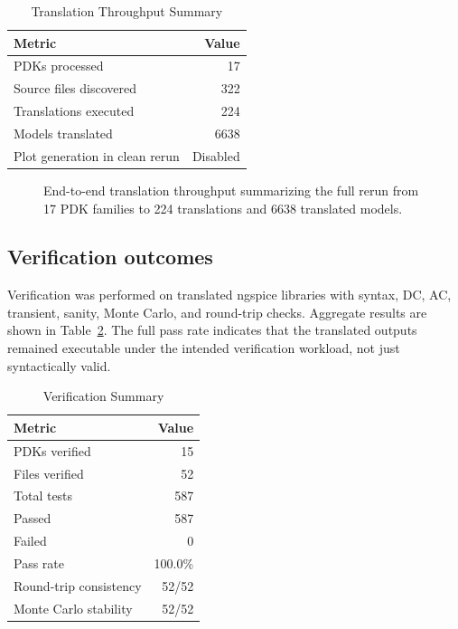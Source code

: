 \documentclass[10pt,twocolumn]{article}
\begin{document}
\begin{table}[t]
\caption{Translation Throughput Summary}
\label{tab:throughput}
\centering
\begin{tabular}{@{}lr@{}}
\toprule
Metric & Value \\
\midrule
PDKs processed & 17 \\
Source files discovered & 322 \\
Translations executed & 224 \\
Models translated & 6638 \\
Plot generation in clean rerun & Disabled \\
\bottomrule
\end{tabular}
\end{table}

\begin{figure}[t]
\centering
{}
\caption{End-to-end translation throughput summarizing the full rerun from 17 PDK families to 224 translations and 6638 translated models.}
\label{fig:throughput}
\end{figure}

\subsection{Verification outcomes}
Verification was performed on translated ngspice libraries with syntax, DC, AC, transient, sanity, Monte Carlo, and round-trip checks. Aggregate results are shown in Table~\ref{tab:verification_summary}. The full pass rate indicates that the translated outputs remained executable under the intended verification workload, not just syntactically valid.

\begin{table}[t]
\caption{Verification Summary}
\label{tab:verification_summary}
\centering
\begin{tabular}{@{}lr@{}}
\toprule
Metric & Value \\
\midrule
PDKs verified & 15 \\
Files verified & 52 \\
Total tests & 587 \\
Passed & 587 \\
Failed & 0 \\
Pass rate & 100.0\% \\
Round-trip consistency & 52/52 \\
Monte Carlo stability & 52/52 \\
\bottomrule
\end{tabular}
\end{table}
\end{document}
